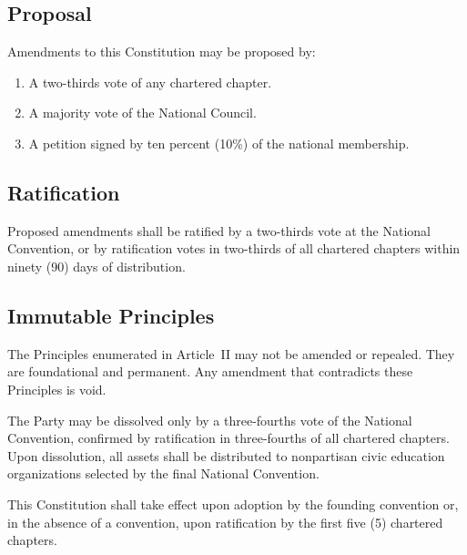 \documentclass[11pt, letterpaper]{article}
\begin{document}

\subsection{Proposal}
Amendments to this Constitution may be proposed by:
\begin{enumerate}
  \item A two-thirds vote of any chartered chapter.
  \item A majority vote of the National Council.
  \item A petition signed by ten percent (10\%) of the national membership.
\end{enumerate}

\subsection{Ratification}
Proposed amendments shall be ratified by a two-thirds vote at the National Convention, or by ratification votes in two-thirds of all chartered chapters within ninety (90) days of distribution.

\subsection{Immutable Principles}
The Principles enumerated in Article~II may not be amended or repealed. They are foundational and permanent. Any amendment that contradicts these Principles is void.



The Party may be dissolved only by a three-fourths vote of the National Convention, confirmed by ratification in three-fourths of all chartered chapters. Upon dissolution, all assets shall be distributed to nonpartisan civic education organizations selected by the final National Convention.



This Constitution shall take effect upon adoption by the founding convention or, in the absence of a convention, upon ratification by the first five (5) chartered chapters.

\newpage
\end{document}
